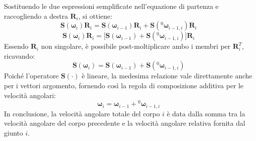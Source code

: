 \documentclass[11pt, a4paper]{report}
\begin{document}
Sostituendo le due espressioni semplificate nell'equazione di partenza e raccogliendo a destra \(\bm{R}_i\), si ottiene:
\[
    \bm{S}(\bm{\omega}_i)\bm{R}_i = \bm{S}(\bm{\omega}_{i-1})\bm{R}_i + \bm{S}({}^{0}\bm{\omega}_{i-1,i})\bm{R}_i
\]
\[
    \bm{S}(\bm{\omega}_i)\bm{R}_i = \biggl[\bm{S}(\bm{\omega}_{i-1}) + \bm{S}({}^{0}\bm{\omega}_{i-1,i})\biggr]\bm{R}_i
\]
Essendo \(\bm{R}_i\) non singolare, è possibile post-moltiplicare ambo i membri per \(\bm{R}_i^T\), ricavando:
\[
    \bm{S}(\bm{\omega}_i) = \bm{S}(\bm{\omega}_{i-1}) + \bm{S}({}^{0}\bm{\omega}_{i-1,i})
\]
Poiché l'operatore \(\bm{S}(\cdot)\) è lineare, la medesima relazione vale direttamente anche per i vettori argomento, fornendo così la regola di composizione additiva per le velocità angolari:
\[
    \bm{\omega}_i = \bm{\omega}_{i-1} + {}^{0}\bm{\omega}_{i-1,i}
\]
In conclusione, la velocità angolare totale del corpo \(i\) è data dalla somma tra la velocità angolare del corpo precedente e la velocità angolare relativa fornita dal giunto \(i\).
\end{document}
